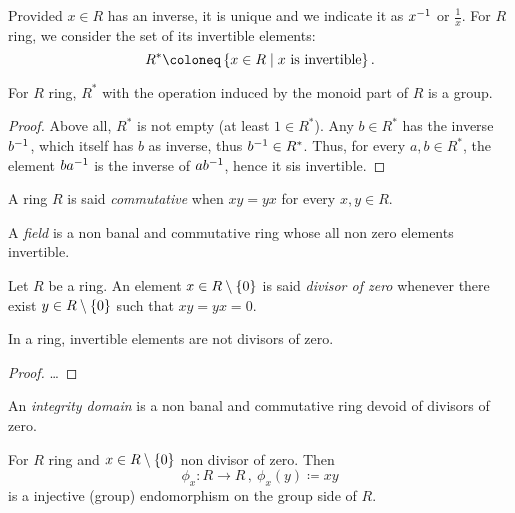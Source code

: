 Provided \(x \in R\) has an inverse, it is unique and we indicate it as \(x^{-1}\) or \(\frac 1x\). For \(R\) ring, we consider the set of its invertible elements:
\[R^\ast \coloneq \set{x \in R \mid x \text{ is invertible}} .\]

\begin{proposition}
For \(R\) ring, \(R^\ast\) with the operation induced by the monoid part of \(R\) is a group.
\end{proposition}

\begin{proof}
Above all, \(R^\ast\) is not empty (at least \(1 \in R^\ast\)). Any \(b \in R^\ast\) has the inverse \(b^{-1}\), which itself has \(b\) as inverse, thus \(b^{-1} \in R^\ast\). Thus, for every \(a, b \in R^\ast\), the element \(b a^{-1}\) is the inverse of \(a b^{-1}\), hence it sis invertible.
\end{proof}

\begin{definition}
A ring \(R\) is said {\em commutative} when \(xy = yx\) for every \(x, y \in R\).
\end{definition}

\begin{definition}[Fields]
A {\em field} is a non banal and commutative ring whose all non zero elements invertible.
\end{definition}

\begin{definition}
Let \(R\) be a ring. An element \(x \in R \setminus \left\{0\right\}\) is said {\em divisor of zero} whenever there exist \(y \in R \setminus \left\{0\right\}\) such that \(xy = yx = 0\).
\end{definition}

\begin{proposition}
In a ring, invertible elements are not divisors of zero.
\end{proposition}

\begin{proof}
\dots{}
\end{proof}

\begin{definition}
An {\em integrity domain} is a non banal and commutative ring devoid of divisors of zero.
\end{definition}

\begin{lemma}
For \(R\) ring and \(x \in R \setminus \left\{0\right\}\) non divisor of zero. Then
\[\phi_x : R \to R\,, \ \phi_x (y) \coloneq xy\]
is a injective (group) endomorphism on the group side of \(R\). 
\end{lemma}

